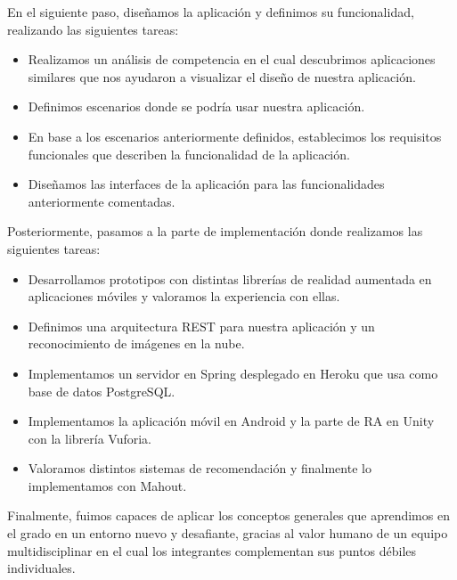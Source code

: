 En el siguiente paso, diseñamos la aplicación y definimos su funcionalidad,
 realizando las siguientes tareas:
\begin{itemize}
    \item Realizamos un análisis de competencia en el cual descubrimos
     aplicaciones similares que nos ayudaron a visualizar el diseño de nuestra
     aplicación.
    \item Definimos escenarios donde se podría usar nuestra aplicación.
    \item En base a los escenarios anteriormente definidos, establecimos los
     requisitos funcionales que describen la funcionalidad de la aplicación.
    \item Diseñamos las interfaces de la aplicación para las funcionalidades
     anteriormente comentadas.
\end{itemize}

Posteriormente, pasamos a la parte de implementación donde realizamos las
 siguientes tareas:
\begin{itemize}
    \item Desarrollamos prototipos con distintas librerías de realidad
     aumentada en aplicaciones móviles y valoramos la experiencia con ellas.
    \item Definimos una arquitectura REST para nuestra aplicación y un
     reconocimiento de imágenes en la nube.
    \item Implementamos un servidor en Spring desplegado en Heroku que usa como
     base de datos PostgreSQL.
    \item Implementamos la aplicación móvil en Android y la parte de RA en Unity
     con la librería Vuforia.
    \item Valoramos distintos sistemas de recomendación y finalmente lo
     implementamos con Mahout.
\end{itemize}

Finalmente, fuimos capaces de aplicar los conceptos generales que aprendimos
 en el grado en un entorno nuevo y desafiante, gracias al valor humano de
 un equipo multidisciplinar en el cual los integrantes complementan sus
 puntos débiles individuales. 

